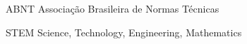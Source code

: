 %
%
%

\begin{siglas}

\item[ABNT] Associação Brasileira de Normas Técnicas
\item[STEM] Science, Technology, Engineering, Mathematics

\end{siglas}

